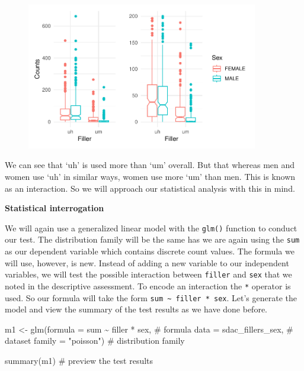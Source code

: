 \documentclass[
  letterpaper,
]{latex/krantz}
\newenvironment{Shaded}{\begin{snugshade}}{\end{snugshade}}
\newcommand{\AttributeTok}[1]{\textcolor[rgb]{0.40,0.45,0.13}{#1}}
\newcommand{\CommentTok}[1]{\textcolor[rgb]{0.37,0.37,0.37}{#1}}
\newcommand{\FunctionTok}[1]{\textcolor[rgb]{0.28,0.35,0.67}{#1}}
\newcommand{\NormalTok}[1]{\textcolor[rgb]{0.00,0.23,0.31}{#1}}
\newcommand{\OtherTok}[1]{\textcolor[rgb]{0.00,0.23,0.31}{#1}}
\newcommand{\SpecialCharTok}[1]{\textcolor[rgb]{0.37,0.37,0.37}{#1}}
\newcommand{\StringTok}[1]{\textcolor[rgb]{0.13,0.47,0.30}{#1}}
\begin{document}
\begin{figure}[H]

{\centering \includegraphics[width=0.9\textwidth,height=\textheight]{./inference_files/figure-pdf/i-mulit-cont-visual-1.pdf}

}

\end{figure}

We can see that `uh' is used more than `um' overall. But that whereas
men and women use `uh' in similar ways, women use more `um' than men.
This is known as an interaction. So we will approach our statistical
analysis with this in mind.

\textbf{Statistical interrogation}

We will again use a generalized linear model with the \texttt{glm()}
function to conduct our test. The distribution family will be the same
has we are again using the \texttt{sum} as our dependent variable which
contains discrete count values. The formula we will use, however, is
new. Instead of adding a new variable to our independent variables, we
will test the possible interaction between \texttt{filler} and
\texttt{sex} that we noted in the descriptive assessment. To encode an
interaction the \texttt{*} operator is used. So our formula will take
the form \texttt{sum\ \textasciitilde{}\ filler\ *\ sex}. Let's generate
the model and view the summary of the test results as we have done
before.

\begin{Shaded}
\begin{Highlighting}[]
\NormalTok{m1 }\OtherTok{\textless{}{-}} 
  \FunctionTok{glm}\NormalTok{(}\AttributeTok{formula =}\NormalTok{ sum }\SpecialCharTok{\textasciitilde{}}\NormalTok{ filler }\SpecialCharTok{*}\NormalTok{ sex, }\CommentTok{\# formula}
      \AttributeTok{data =}\NormalTok{ sdac\_fillers\_sex, }\CommentTok{\# dataset}
      \AttributeTok{family =} \StringTok{"poisson"}\NormalTok{) }\CommentTok{\# distribution family}

\FunctionTok{summary}\NormalTok{(m1) }\CommentTok{\# preview the test results}
\end{Highlighting}
\end{Shaded}
\end{document}
